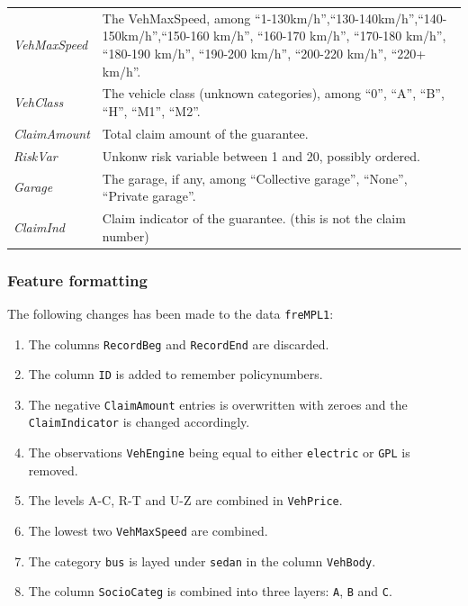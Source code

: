 \documentclass[
]{article}
\providecommand{\tightlist}{%
  \setlength{\itemsep}{0pt}\setlength{\parskip}{0pt}}
\begin{document}
\begin{longtable}[]{@{}
  >{\raggedright\arraybackslash}p{}
  >{\raggedright\arraybackslash}p{}@{}}
\emph{VehMaxSpeed} & The VehMaxSpeed, among
``1-130km/h'',``130-140km/h'',``140-150km/h'',``150-160 km/h'',
``160-170 km/h'', ``170-180 km/h'', ``180-190 km/h'', ``190-200 km/h'',
``200-220 km/h'', ``220+ km/h''. \\
\emph{VehClass} & The vehicle class (unknown categories), among ``0'',
``A'', ``B'', ``H'', ``M1'', ``M2''. \\
\emph{ClaimAmount} & Total claim amount of the guarantee. \\
\emph{RiskVar} & Unkonw risk variable between 1 and 20, possibly
ordered. \\
\emph{Garage} & The garage, if any, among ``Collective garage'',
``None'', ``Private garage''. \\
\emph{ClaimInd} & Claim indicator of the guarantee. (this is not the
claim number) \\
\bottomrule()
\end{longtable}

\hypertarget{feature-formatting}{%
\subsubsection{Feature formatting}\label{feature-formatting}}

The following changes has been made to the data \texttt{freMPL1}:

\begin{enumerate}
\def\labelenumi{\arabic{enumi}.}
\tightlist
\item
  The columns \texttt{RecordBeg} and \texttt{RecordEnd} are discarded.
\item
  The column \texttt{ID} is added to remember policynumbers.
\item
  The negative \texttt{ClaimAmount} entries is overwritten with zeroes
  and the \texttt{ClaimIndicator} is changed accordingly.
\item
  The observations \texttt{VehEngine} being equal to either
  \texttt{electric} or \texttt{GPL} is removed.
\item
  The levels A-C, R-T and U-Z are combined in \texttt{VehPrice}.
\item
  The lowest two \texttt{VehMaxSpeed} are combined.
\item
  The category \texttt{bus} is layed under \texttt{sedan} in the column
  \texttt{VehBody}.
\item
  The column \texttt{SocioCateg} is combined into three layers:
  \texttt{A}, \texttt{B} and \texttt{C}.
\end{enumerate}
\end{document}
